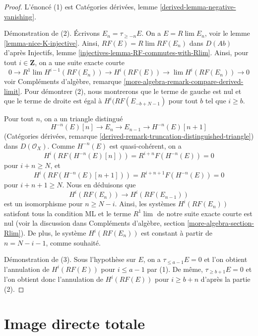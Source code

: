 \begin{proof}
L'énoncé (1) est
Catégories dérivées, lemme \ref{derived-lemma-negative-vanishing}.

\medskip\noindent
Démonstration de (2). Écrivons $E_n = \tau_{\geq -n}E$. On a
$E = R\lim E_n$, voir le lemme \ref{lemma-nice-K-injective}. Ainsi,
$RF(E) = R\lim RF(E_n)$ dans $D(\textit{Ab})$ d'après Injectifs, lemme
\ref{injectives-lemma-RF-commutes-with-Rlim}. Ainsi, pour tout $i \in \mathbf{Z}$,
on a une suite exacte courte
$$
0 \to R^1\lim H^{i - 1}(RF(E_n)) \to H^i(RF(E)) \to \lim H^i(RF(E_n)) \to 0
$$
voir Compléments d'algèbre, remarque
\ref{more-algebra-remark-compare-derived-limit}.
Pour démontrer (2), nous montrerons que le terme de gauche est nul
et que le terme de droite est égal à $H^i(RF(E_{-b + N - 1})$
pour tout $b$ tel que $i \geq b$.

\medskip\noindent
Pour tout $n$, on a un triangle distingué
$$
H^{-n}(E)[n] \to E_n \to E_{n - 1} \to H^{-n}(E)[n + 1]
$$
(Catégories dérivées, remarque
\ref{derived-remark-truncation-distinguished-triangle})
dans $D(\mathcal{O}_X)$. Comme $H^{-n}(E)$ est quasi-cohérent, on a
$$
H^i(RF(H^{-n}(E)[n])) = R^{i + n}F(H^{-n}(E)) = 0
$$
pour $i + n \geq N$, et
$$
H^i(RF(H^{-n}(E)[n + 1])) = R^{i + n + 1}F(H^{-n}(E)) = 0
$$
pour $i + n + 1 \geq N$. Nous en déduisons que
$$
H^i(RF(E_n)) \to H^i(RF(E_{n - 1}))
$$
est un isomorphisme pour $n \geq N - i$. Ainsi, les systèmes $H^i(RF(E_n))$
satisfont tous la condition ML et le terme $R^1\lim$ de notre suite exacte courte
est nul (voir la discussion dans
Compléments d'algèbre, section \ref{more-algebra-section-Rlim}).
De plus, le système $H^i(RF(E_n))$ est constant à partir
de $n = N - i - 1$, comme souhaité.

\medskip\noindent
Démonstration de (3). Sous l'hypothèse sur $E$, on a
$\tau_{\leq a - 1}E = 0$ et l'on obtient l'annulation
de $H^i(RF(E))$ pour $i \leq a - 1$ par (1).
De même, $\tau_{\geq b + 1}E = 0$ et l'on obtient donc
l'annulation de $H^i(RF(E))$ pour $i \geq b + n$ d'après
la partie (2).
\end{proof}









\section{Image directe totale}
\label{section-total-direct-image}

